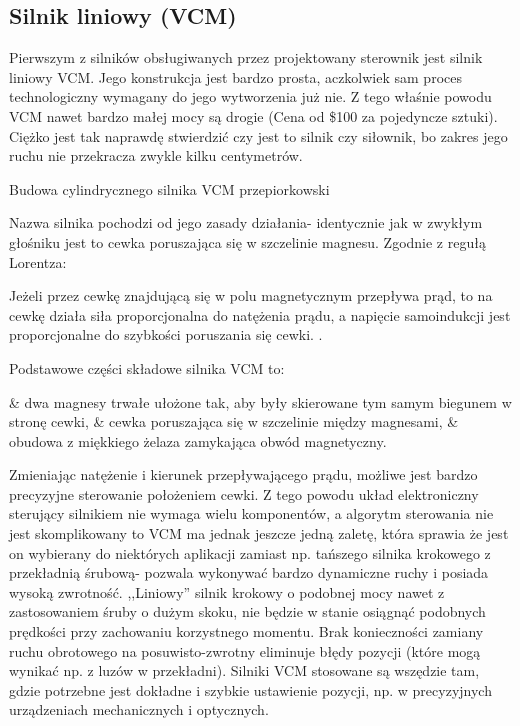 \subsection{Silnik liniowy (VCM)}

Pierwszym z silników obsługiwanych przez projektowany sterownik jest silnik liniowy VCM. Jego konstrukcja jest bardzo prosta, aczkolwiek sam proces technologiczny wymagany do jego wytworzenia już nie. Z tego właśnie powodu VCM nawet bardzo małej mocy są drogie (Cena od \$100 za pojedyncze sztuki). Ciężko jest tak naprawdę stwierdzić czy jest to silnik czy siłownik, bo zakres jego ruchu nie przekracza zwykle kilku centymetrów.

	{Budowa cylindrycznego silnika VCM}
	{przepiorkowski}

Nazwa silnika pochodzi od jego zasady działania- identycznie jak w zwykłym głośniku jest to cewka poruszająca się w szczelinie magnesu. Zgodnie z regułą Lorentza:

\begin{defn}
	Jeżeli przez cewkę znajdującą się w polu magnetycznym przepływa prąd, to na cewkę działa siła proporcjonalna do natężenia prądu, a napięcie samoindukcji jest proporcjonalne do szybkości poruszania się cewki. \cite{przepiorkowski}.
\end{defn}

Podstawowe części składowe silnika VCM to:
\begin{easylist}
	& dwa magnesy trwałe ułożone tak, aby były skierowane tym samym biegunem w stronę cewki,
	& cewka poruszająca się w szczelinie między magnesami,
	& obudowa z miękkiego żelaza zamykająca obwód magnetyczny.
	\\
\end{easylist}

Zmieniając natężenie i kierunek przepływającego prądu, możliwe jest bardzo precyzyjne sterowanie położeniem cewki. Z tego powodu układ elektroniczny sterujący silnikiem nie wymaga wielu komponentów, a algorytm sterowania nie jest skomplikowany to VCM ma jednak jeszcze jedną zaletę, która sprawia że jest on wybierany do niektórych aplikacji zamiast np. tańszego silnika krokowego z przekładnią śrubową- pozwala wykonywać bardzo dynamiczne ruchy i posiada wysoką zwrotność. ,,Liniowy'' silnik krokowy o podobnej mocy nawet z zastosowaniem śruby o dużym skoku, nie będzie w stanie osiągnąć podobnych prędkości przy zachowaniu korzystnego momentu. Brak konieczności zamiany ruchu obrotowego na posuwisto-zwrotny eliminuje błędy pozycji (które mogą wynikać np. z luzów w przekładni). Silniki VCM stosowane są wszędzie tam, gdzie potrzebne jest dokładne i szybkie ustawienie pozycji, np. w precyzyjnych urządzeniach mechanicznych i optycznych. \\

